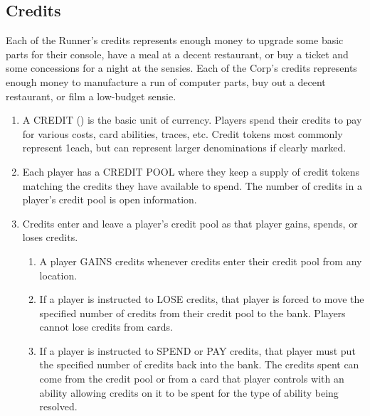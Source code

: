 \subsection{Credits}
Each of the Runner's credits represents enough money to upgrade some basic parts for their console, have a meal at a decent restaurant, or buy a ticket and some concessions for a night at the sensies.
Each of the Corp's credits represents enough money to manufacture a run of computer parts, buy out a decent restaurant, or film a low-budget sensie.
\begin{enumerate}
	\item A CREDIT (\credit) is the basic unit of currency. Players spend their credits to pay for various costs, card abilities, traces, etc. Credit tokens most commonly represent 1\credit each, but can represent larger denominations if clearly marked.
	\item  Each player has a CREDIT POOL where they keep a supply of credit tokens matching the credits they have available to spend. The number of credits in a player's credit pool is open information.
	\item Credits enter and leave a player's credit pool as that player gains, spends, or loses credits.
	      \begin{enumerate}
		      \item A player GAINS credits whenever credits enter their credit pool from any location.
		      \item If a player is instructed to LOSE credits, that player is forced to move the specified number of credits from their credit pool to the bank. Players cannot lose credits from cards.\\[10pt]
		      \item If a player is instructed to SPEND or PAY credits, that player must put the specified	number of credits back into the bank. The credits spent can come from the credit pool or from a card that player controls with an ability allowing credits on it to be spent for the type of ability being resolved.\\[10pt]
		            \\[10pt]
		            \\[10pt]

\end{enumerate}
\end{enumerate}
